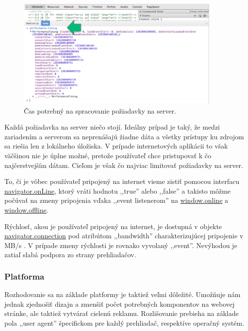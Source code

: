 \begin{figure}[H]
	\centering
	\includegraphics[width=0.9\textwidth]{img/1000ms.png}
	\caption[Čas potrebný na spracovanie požiadavky na server]{
		Čas potrebný na spracovanie požiadavky na server.}
	\label{fig: 1000ms}
\end{figure}

Každá požiadavka na server niečo stojí. Ideálny prípad je taký, že medzi zariadením a serverom sa neprenášajú žiadne dáta a všetky prístupy ku zdrojom sa riešia len z lokálneho úložiska. V prípade internetových aplikácii to však väčšinou nie je úplne možné, pretože používateľ chce pristupovať k čo najčerstvejším dátam. Cieľom je však čo najviac limitovať požiadavky na server.

To, či je vôbec používateľ pripojený na internet vieme zistiť pomocou interfacu \url{navigator.onLine}, ktorý vráti hodnotu ,,true'' alebo ,,false'' a takisto môžme počúvať na zmeny pripojenia vďaka ,,event listenerom'' na \url{window.online} a \url{window.offline}.

Rýchlosť, akou je používateľ pripojený na internet, je dostupná v objekte \url{navigator.connection} pod atribútom ,,bandwidth'' charakterizujúcej pripojenie v MB/s \cite{network}. V prípade zmeny rýchlosti je rovnako vyvolaný ,,event''. Nevýhodou je zatiaľ slabá podpora zo strany prehliadačov.


\subsubsection{Platforma} %
\label{ssub:platforma}

Rozhodovanie sa na základe platformy je taktiež veľmi dôležité. Umožňuje nám jednak zjednošiť dizajn a zmenšiť počet potrebných komponentov na webovej stránke, ale taktiež vytvárať cielenú reklamu. Rozlišovanie prebieha na základe pola ,,user agent'' špecifickom pre každý prehliadač, respektíve operačný systém.

